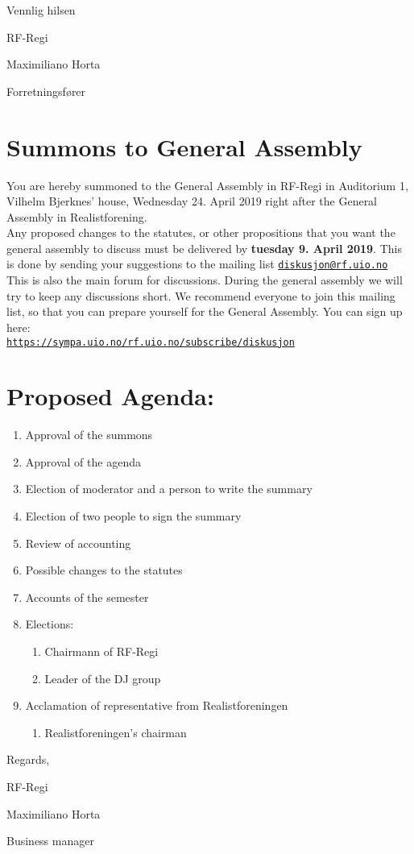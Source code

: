 \documentclass[a4paper]{article}
\begin{document}
\vspace{2.5cm}

Vennlig hilsen

RF-Regi

Maximiliano Horta

Forretningsfører

\newpage

\section*{\textsf{\textbf{\huge Summons to General Assembly}}}
\vspace{1cm}

You are hereby summoned to the General Assembly in RF-Regi in Auditorium 1,
Vilhelm Bjerknes' house, Wednesday 24. April 2019 right after
the General Assembly in Realistforening. \\


Any proposed changes to the statutes, or other propositions that you want the general
assembly to discuss must be delivered by \textbf{tuesday 9. April 2019}.
This is done by sending your suggestions to the mailing list \linebreak
\href{mailto:diskusjon@rf.uio.no}{\texttt{diskusjon@rf.uio.no}} \\


This is also the main forum for discussions. During the general assembly we will try to keep
any discussions short. We recommend everyone to join this mailing list, so that you can
prepare yourself for the General Assembly. You can sign up here: \\
\texttt{\url{https://sympa.uio.no/rf.uio.no/subscribe/diskusjon}}\\

\section*{\textsf{Proposed Agenda:}}
\begin{enumerate}
    \item Approval of the summons
    \item Approval of the agenda
    \item Election of moderator and a person to write the summary
    \item Election of two people to sign the summary
    \item Review of accounting
    \item Possible changes to the statutes
    \item Accounts of the semester
    \item Elections:
    \begin{enumerate}
        \item Chairmann of RF-Regi
        \item Leader of the DJ group
    \end{enumerate}
    \item Acclamation of representative from Realistforeningen
    \begin{enumerate}
        \item Realistforeningen's chairman
    \end{enumerate}
\end{enumerate}

\vspace{2cm}
Regards,

RF-Regi

Maximiliano Horta

Business manager
\end{document}
